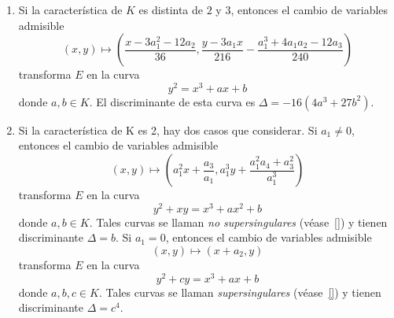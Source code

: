 \begin{enumerate}
	\item Si la característica de $K$ es distinta de $2$ y $3$, entonces el cambio de variables admisible
	$$
	(x, y) \mapsto \left(\frac{x - 3 a_1^2 - 12 a_2}{36}, \frac{y - 3 a_1 x}{216} - \frac{a_1^3 + 4 a_1 a_2 - 12 a_3}{240}\right)
	$$
	transforma $E$ en la curva
	\begin{equation*}\label{eq:ecuación Weierstrass}
		y^2 = x^3 + a x + b
	\end{equation*}
	donde $a, b \in K$. El discriminante de esta curva es $\Delta = -16(4a^3 + 27b^2)$.

	\item Si la característica de K es 2, hay dos casos que considerar. Si $a_1 \neq 0$, entonces el cambio de variables admisible
	$$
	(x, y) \mapsto \left(a_1^2 x + \frac{a_3}{a_1}, a_1^3 y + \frac{a_1^2 a_4 + a_3^2}{a_1^3} \right)
	$$
	transforma $E$ en la curva
	\begin{equation*}
		y^2 + xy = x^3 + a x^2 + b
	\end{equation*}
	donde $a, b \in K$. Tales curvas se llaman \emph{no supersingulares} (véase~\ref{}) y tienen discriminante $\Delta = b$. Si $a_1 = 0$, entonces el cambio de variables admisible
	$$
	(x, y) \mapsto (x + a_2, y)
	$$
	transforma $E$ en la curva
	\begin{equation*}
		y^2 + c y = x^3 + a x + b
	\end{equation*}
	donde $a, b, c \in K$. Tales curvas se llaman \emph{supersingulares} (véase~\ref{}) y tienen discriminante $\Delta = c^4$.

\end{enumerate}
